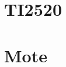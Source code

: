 \documentclass[aspectratio=169]{beamer}
\begin{document}
\section{TI2520}

\section{Mote}

%
%
%
\end{document}
